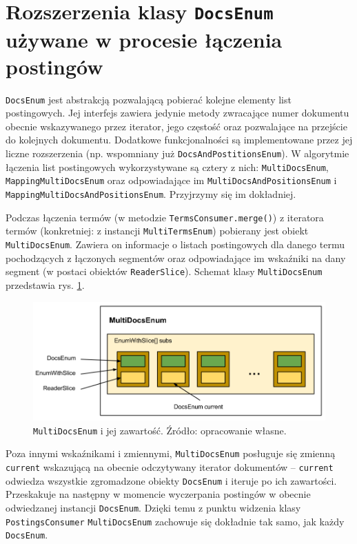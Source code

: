 \section{Rozszerzenia klasy \texttt{DocsEnum} używane w procesie łączenia postingów}

\texttt{DocsEnum} jest abstrakcją pozwalającą pobierać kolejne elementy list postingowych. Jej interfejs zawiera jedynie metody zwracające numer dokumentu obecnie wskazywanego przez iterator, jego częstość oraz pozwalające na przejście do kolejnych dokumentu. Dodatkowe funkcjonalności są implementowane przez jej liczne rozszerzenia (np. wspomniany już \texttt{DocsAndPostitionsEnum}). W algorytmie łączenia list postingowych wykorzystywane są cztery z nich: \texttt{MultiDocsEnum}, \texttt{MappingMultiDocsEnum} oraz odpowiadające im \texttt{MultiDocsAndPositionsEnum} i \texttt{MappingMultiDocsAndPositionsEnum}. Przyjrzymy się im dokładniej.

Podczas łączenia termów (w metodzie \texttt{TermsConsumer.merge()}) z iteratora termów (konkretniej: z instancji \texttt{MultiTermsEnum}) pobierany jest obiekt \texttt{MultiDocsEnum}. Zawiera on informacje o listach postingowych dla danego termu pochodzących z łączonych segmentów oraz odpowiadające im wskaźniki na dany segment (w postaci obiektów \texttt{ReaderSlice}). Schemat klasy \texttt{MultiDocsEnum} przedstawia rys. \ref{fig:multiDocsEnum}.

\begin{figure}[here]
 \includegraphics[scale=0.4]{pictures/MultiDocsEnum.png}
 \caption{\texttt{MultiDocsEnum} i jej zawartość. Źródło: opracowanie własne. \label{fig:multiDocsEnum}}
\end{figure}

Poza innymi wskaźnikami i zmiennymi, \texttt{MultiDocsEnum} posługuje się zmienną \texttt{current} wskazującą na obecnie odczytywany iterator dokumentów -- \texttt{current} odwiedza wszystkie zgromadzone obiekty \texttt{DocsEnum} i iteruje po ich zawartości. Przeskakuje na następny w momencie wyczerpania postingów w obecnie odwiedzanej instancji \texttt{DocsEnum}. Dzięki temu z punktu widzenia klasy \texttt{PostingsConsumer} \texttt{MultiDocsEnum} zachowuje się dokładnie tak samo, jak każdy \texttt{DocsEnum}. 

